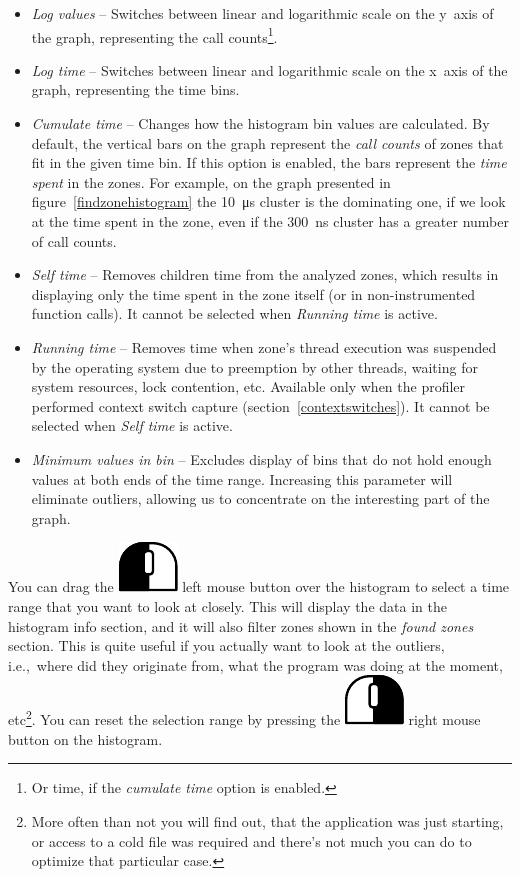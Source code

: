 \documentclass[hidelinks,titlepage,a4paper]{article}
\newcommand{\LMB}{\includegraphics[height=.8\baselineskip]{icons/lmb}}
\newcommand{\RMB}{\includegraphics[height=.8\baselineskip]{icons/rmb}}
\begin{document}
\begin{itemize}
\item \emph{Log values} -- Switches between linear and logarithmic scale on the y~axis of the graph, representing the call counts\footnote{Or time, if the \emph{cumulate time} option is enabled.}.
\item \emph{Log time} -- Switches between linear and logarithmic scale on the x~axis of the graph, representing the time bins.
\item \emph{Cumulate time} -- Changes how the histogram bin values are calculated. By default, the vertical bars on the graph represent the \emph{call counts} of zones that fit in the given time bin. If this option is enabled, the bars represent the \emph{time spent} in the zones. For example, on the graph presented in figure~\ref{findzonehistogram} the 10~\si{\micro\second} cluster is the dominating one, if we look at the time spent in the zone, even if the 300~\si{\nano\second} cluster has a greater number of call counts.
\item \emph{Self time} -- Removes children time from the analyzed zones, which results in displaying only the time spent in the zone itself (or in non-instrumented function calls). It cannot be selected when \emph{Running time} is active.
\item \emph{Running time} -- Removes time when zone's thread execution was suspended by the operating system due to preemption by other threads, waiting for system resources, lock contention, etc. Available only when the profiler performed context switch capture (section~\ref{contextswitches}). It cannot be selected when \emph{Self time} is active.
\item \emph{Minimum values in bin} -- Excludes display of bins that do not hold enough values at both ends of the time range. Increasing this parameter will eliminate outliers, allowing us to concentrate on the interesting part of the graph.
\end{itemize}

You can drag the \LMB{} left mouse button over the histogram to select a time range that you want to look at closely. This will display the data in the histogram info section, and it will also filter zones shown in the \emph{found zones} section. This is quite useful if you actually want to look at the outliers, i.e.,\ where did they originate from, what the program was doing at the moment, etc\footnote{More often than not you will find out, that the application was just starting, or access to a cold file was required and there's not much you can do to optimize that particular case.}. You can reset the selection range by pressing the \RMB{} right mouse button on the histogram.
\end{document}
